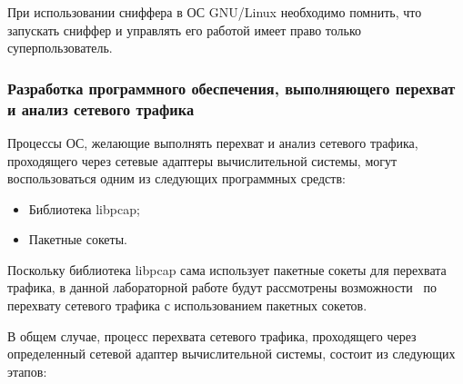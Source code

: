 	При использовании сниффера в ОС GNU/Linux необходимо помнить, что запускать сниффер и управлять его работой
	имеет право только суперпользователь.

\subsubsection{Разработка программного обеспечения, выполняющего перехват и анализ сетевого трафика}

	Процессы ОС, желающие выполнять перехват и анализ сетевого трафика, проходящего через сетевые адаптеры
	вычислительной системы, могут воспользоваться одним из следующих программных средств:

	\begin{itemize}

		\item Библиотека libpcap;
		\item Пакетные сокеты.

	\end{itemize}

	Поскольку библиотека libpcap сама использует пакетные сокеты для перехвата трафика,
	в данной лабораторной работе будут рассмотрены возможности \linux\ по перехвату сетевого трафика
	с использованием пакетных сокетов.

	В общем случае, процесс перехвата сетевого трафика, проходящего через определенный сетевой адаптер вычислительной
	системы, состоит из следующих этапов:

